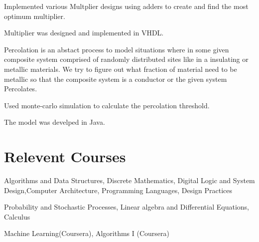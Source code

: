 \documentclass[]{deedy-resume-openfont}
\begin{document}
\vspace{\topsep}
\begin{tightemize}
\item Implemented various Multplier designs using adders to create and find the most optimum multiplier. 
\item Multiplier was designed and implemented in VHDL. 
\end{tightemize}
\sectionsep

\vspace{\topsep}
\begin{tightemize}
\item Percolation is an abstact process to model situations where in some given composite system comprised of randomly distributed sites like in a insulating or metallic materials. We try to figure out what fraction of material need to be metallic so that the composite system is a conductor or the given system Percolates. 
\item  Used monte-carlo simulation to calculate the percolation threshold.
\item The model was develped in Java. 
\end{tightemize}
\sectionsep


\section{Relevent Courses}
\location{}
\begin{tightemize}
\item Algorithms and Data Structures, Discrete Mathematics, Digital Logic and System Design,Computer Architecture, Programming Languages, Design Practices
\end{tightemize}
\sectionsep

\location{}
\begin{tightemize}
\item Probability and Stochastic Processes, Linear algebra and Differential Equations, Calculus
\end{tightemize}
\sectionsep

\location{}
\begin{tightemize}
\item Machine Learning(Coursera), Algorithms I (Coursera) 
\end{tightemize}
\sectionsep
\end{document}
